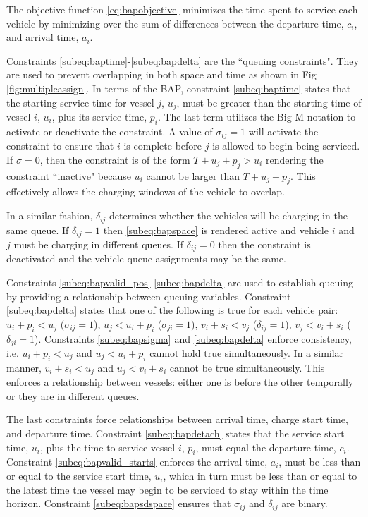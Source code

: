 \documentclass[letterpaper, 10pt, conference]{IEEEtran}
\begin{document}
The objective function \eqref{eq:bapobjective} minimizes the time spent to service each vehicle by minimizing over the sum of differences between the departure time, \(c_i\), and arrival time, \(a_i\).

Constraints \ref{subeq:baptime}-\ref{subeq:bapdelta} are the ``queuing constraints". They are used to prevent overlapping in both space and time as shown in Fig \ref{fig:multipleassign}. In terms of the BAP, constraint \eqref{subeq:baptime} states that the starting service time for vessel \(j\), \(u_j\), must be greater than the starting time of vessel \(i\), \(u_i\), plus its service time, \(p_i\). The last term utilizes the Big-M notation to activate or deactivate the constraint. A value of \(\sigma_{ij} = 1\) will activate the constraint to ensure that \(i\) is complete before \(j\) is allowed to begin being serviced. If \(\sigma = 0\), then the constraint is of the form \(T + u_j + p_j > u_i\) rendering the constraint ``inactive" because \(u_i\) cannot be larger than \(T + u_j + p_j\). This effectively allows the charging windows of the vehicle to overlap.

In a similar fashion, \(\delta_{ij}\) determines whether the vehicles will be charging in the same queue. If \(\delta_{ij} = 1\) then \eqref{subeq:bapspace} is rendered active and vehicle \(i\) and \(j\) must be charging in different queues. If \(\delta_{ij} = 0\) then the constraint is deactivated and the vehicle queue assignments may be the same.

Constraints \ref{subeq:bapvalid_pos}-\ref{subeq:bapdelta} are used to establish queuing by providing a relationship between queuing variables. Constraint \eqref{subeq:bapdelta} states that one of the following is true for each vehicle pair: \(u_i + p_i < u_j\) (\(\sigma_{ij} = 1\)), \(u_j < u_i + p_i\) (\(\sigma_{ji} = 1\)), \(v_i + s_i < v_j\) (\(\delta_{ij} = 1\)), \(v_j < v_i + s_i\) (\(\delta_{ji} = 1\)). Constraints \eqref{subeq:bapsigma} and \eqref{subeq:bapdelta} enforce consistency, i.e. \(u_i + p_i < u_j\) and \(u_j < u_i + p_i\) cannot hold true simultaneously. In a similar manner, \(v_i + s_i < u_j\) and \(u_j < v_i + s_i\) cannot be true simultaneously. This enforces a relationship between vessels: either one is before the other temporally or they are in different queues.

The last constraints force relationships between arrival time, charge start time, and departure time. Constraint \eqref{subeq:bapdetach} states that the service start time, \(u_i\), plus the time to service vessel \(i\), \(p_i\), must equal the departure time, \(c_i\). Constraint \eqref{subeq:bapvalid_starts} enforces the arrival time, \(a_i\), must be less than or equal to the service start time, \(u_i\), which in turn must be less than or equal to the latest time the vessel may begin to be serviced to stay within the time horizon. Constraint \eqref{subeq:bapsdspace} ensures that \(\sigma_{ij}\) and \(\delta_{ij}\) are binary.
\end{document}
